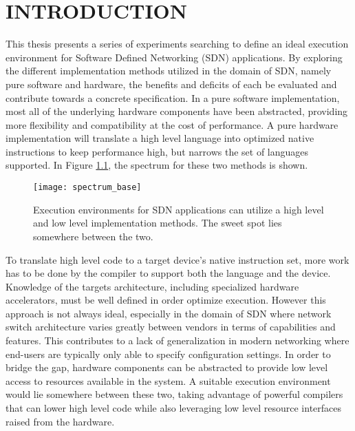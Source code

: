 \chapter{INTRODUCTION}
\label{intro}

This thesis presents a series of experiments searching to define an ideal
execution environment for Software Defined Networking (SDN) applications. By
exploring the different implementation methods utilized in the domain of SDN,
namely pure software and hardware, the benefits and deficits of each be
evaluated and contribute towards a concrete specification. In a pure software
implementation, most all of the underlying hardware components have been
abstracted, providing more flexibility and compatibility at the cost of
performance. A pure hardware implementation will translate a high level
language into optimized native instructions to keep performance high, but
narrows the set of languages supported. In Figure \ref{overview}, the spectrum
for these two methods is shown.

\begin{figure}[h]
\centering
\texttt{[image: spectrum\_base]}
\caption{Execution environments for SDN applications can utilize a high level
and low level implementation methods. The sweet spot lies somewhere between
the two.}
\label{overview}
\end{figure}

To translate high level code to a target device's native instruction set, more
work has to be done by the compiler to support both the language and the
device. Knowledge of the targets architecture, including specialized hardware
accelerators, must be well defined in order optimize execution. However this
approach is not always ideal, especially in the domain of SDN where network
switch architecture varies greatly between vendors in terms of capabilities
and features. This contributes to a lack of generalization in modern networking
where end-users are typically only able to specify configuration settings. In
order to bridge the gap, hardware components can be abstracted to provide
low level access to resources available in the system. A suitable execution
environment would lie somewhere between these two, taking advantage of powerful
compilers that can lower high level code while also leveraging low level
resource interfaces raised from the hardware.

